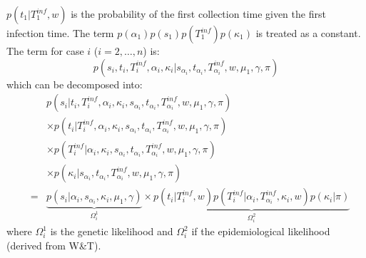 \documentclass[10pt]{article}
\begin{document}
$p(t_1 | T_1^{inf},w)$ is the probability of the first collection time given the first infection time.
The term $p(\alpha_1) p(s_1) p(T_1^{inf}) p(\kappa_1)$ is treated as a constant.
The term for case $i$ ($i=2,\ldots,n$) is:
\begin{equation}
 p(s_i, t_i, T_i^{inf}, \alpha_i, \kappa_i| s_{\alpha_i}, t_{\alpha_i}, T_{\alpha_i}^{inf},  w, \mu_1, \gamma, \pi)
\end{equation}
which can be decomposed into:
\begin{eqnarray}
& & p(s_i | t_i, T_i^{inf}, \alpha_i, \kappa_i, s_{\alpha_i}, t_{\alpha_i}, T_{\alpha_i}^{inf},  w, \mu_1, \gamma, \pi) \nonumber \\
& &  \times  p(t_i | T_i^{inf}, \alpha_i, \kappa_i, s_{\alpha_i}, t_{\alpha_i}, T_{\alpha_i}^{inf},  w, \mu_1, \gamma, \pi) \nonumber \\
& & \times  p(T_i^{inf}| \alpha_i, \kappa_i, s_{\alpha_i}, t_{\alpha_i}, T_{\alpha_i}^{inf},  w, \mu_1, \gamma, \pi) \nonumber \\
& & \times  p(\kappa_i | s_{\alpha_i}, t_{\alpha_i}, T_{\alpha_i}^{inf},  w, \mu_1, \gamma, \pi) \nonumber \\
& = & 
\underbrace{p(s_i | \alpha_i, s_{\alpha_i}, \kappa_i, \mu_1, \gamma)}_{\Omega_i^1} 
  \times  \underbrace{p(t_i | T_i^{inf}, w) 
  p(T_i^{inf}| \alpha_i, T_{\alpha_i}^{inf}, \kappa_i, w) p(\kappa_i | \pi)}_{\Omega_i^2}
\end{eqnarray}
\noindent where $\Omega_i^1$ is the genetic likelihood and $\Omega_i^2$ if the epidemiological likelihood (derived from W\&T).
\\
\end{document}
